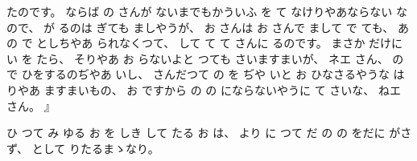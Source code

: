 たのです。
%
ならば
の
さんが
ないまでもかういふ
を
て
なけりやあならない
なので、
%
が
るのは
ぎても
ましやうが、
%
お
さんは
お
さんで
まして
で
ても、
%
あ
の
で
としちやあ
られなくつて、
%
して
て
て
さんに
るのです。
%
まさか
だけに
い
を
たら、
%
そりやあ
お
らないよと
つても
さいますまいが、
%
ネエ
さん、
%
の
で
ひをするのぢやあ
いし、
%
さんだつて
の
を
ぢや%
いと
お
ひなさるやうな
は
りやあ
ますまいもの、
%
お
ですから
の
の
にならないやうに
て
さいな、
%
ねエ
さん。
』

ひ
つて
み
ゆる
お
を
しき
して
たる
お
は、
%
より
に
つて
だ
の
の
をだに
がさず、
%
として
りたるまゝなり。

